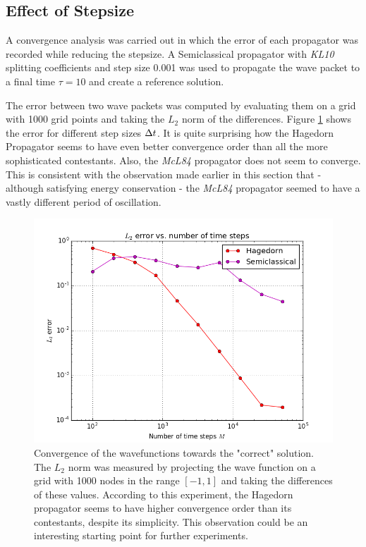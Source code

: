 \subsection{Effect of Stepsize}
\label{subsec:convergence}
%
A convergence analysis was carried out in which the error of each propagator was recorded while reducing the stepsize.
A Semiclassical propagator with \emph{KL10} splitting coefficients and step size 0.001 was used to propagate the wave packet to a final time $\tau = 10$ and create a reference solution.
\par\medskip
%
The error between two wave packets was computed by evaluating them on a grid with 1000 grid points and taking the $L_2$ norm of the differences.
Figure \ref{fig:error_analysis} shows the error for different step sizes $\Delta t$.
It is quite surprising how the Hagedorn Propagator seems to have even better convergence order than all the more sophisticated contestants.
Also, the \emph{McL84} propagator does not seem to converge. This is consistent with the observation made earlier in this section that - although satisfying energy conservation - the \emph{McL84} propagator seemed to have a vastly different period of oscillation.

\begin{figure}[ht]
	\centering
	\includegraphics[width=.8\textwidth]{figures/error_analysis.png}
	\caption{Convergence of the wavefunctions towards the "correct" solution. The $L_2$ norm was measured by projecting the wave function on a grid with 1000 nodes in the range $[-1,1]$ and taking the differences of these values. According to this experiment, the Hagedorn propagator seems to have higher convergence order than its contestants, despite its simplicity.
	This observation could be an interesting starting point for further experiments.}
	\label{fig:error_analysis}
\end{figure}

